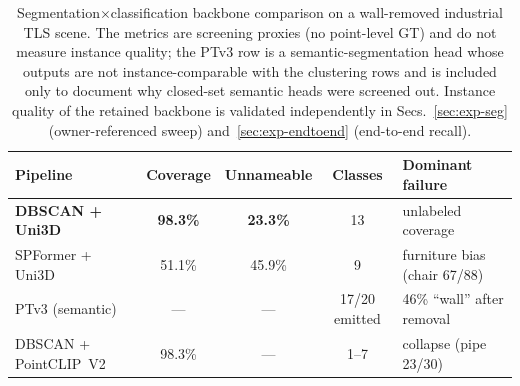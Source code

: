 \begin{table}[t]
\centering
\caption{Segmentation$\times$classification backbone comparison on a
wall-removed industrial TLS scene. The metrics are screening proxies
(no point-level GT) and do not measure instance quality; the PTv3 row
is a semantic-segmentation head whose outputs are not
instance-comparable with the clustering rows and is included only to
document why closed-set semantic heads were screened out. Instance
quality of the retained backbone is validated independently in
Secs.~\ref{sec:exp-seg} (owner-referenced sweep)
and~\ref{sec:exp-endtoend} (end-to-end recall).}
\label{tab:backbones}
\footnotesize
\setlength{\tabcolsep}{4pt}
\begin{tabular}{@{}lcccl@{}}
\toprule
Pipeline & Coverage & Unnameable & Classes & Dominant failure \\
\midrule
\textbf{DBSCAN + Uni3D} & \textbf{98.3\%} & \textbf{23.3\%} & 13 &
unlabeled coverage \\
SPFormer + Uni3D & 51.1\% & 45.9\% & 9 & furniture bias (chair 67/88) \\
PTv3 (semantic) & --- & --- & 17/20 emitted & 46\% ``wall'' after removal \\
DBSCAN + PointCLIP~V2 & 98.3\% & --- & 1--7 & collapse (pipe 23/30) \\
\bottomrule
\end{tabular}
\end{table}

